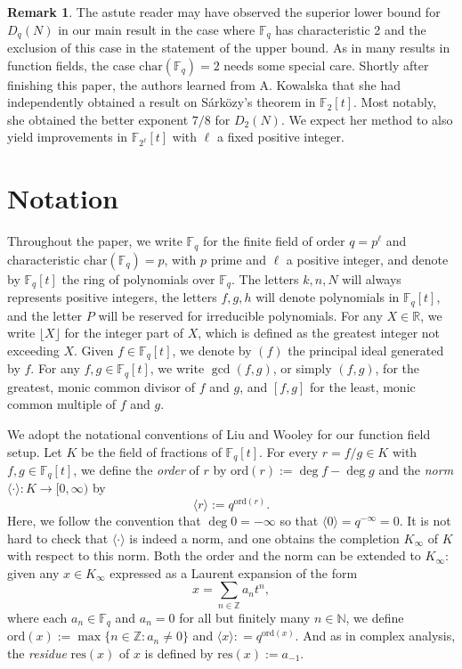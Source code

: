 \documentclass{article}
\theoremstyle{definition}
\theoremstyle{definition}
\newtheorem*{rem}{Remark}
\theoremstyle{remark}
\newcommand{\R}{\mathbb{R}}
\newcommand{\Z}{\mathbb{Z}}
\newcommand{\N}{\mathbb{N}}
\newcommand{\F}{\mathbb{F}_q[t]}
\newcommand{\1}{\mathbf{1}}
\numberwithin{equation}{section}
\begin{document}
\begin{rem}
The astute reader may have observed the superior lower bound for $D_q(N)$ in our main result in the case where $\mathbb{F}_q$ has characteristic 2 and the exclusion of this case in the statement of the upper bound. As in many results in function fields, the case $\text{char}(\mathbb{F}_q)=2$ needs some special care. Shortly after finishing this paper, the authors learned from A. Kowalska \cite{Kowalska26} that she had independently obtained a result on Sárközy's theorem in $\mathbb{F}_2[t]$. Most notably, she obtained the better exponent $7/8$ for $D_2(N)$. We expect her method to also yield improvements in $\mathbb{F}_{2^{\ell}}[t]$ with $\ell$ a fixed positive integer.
\end{rem}



\section{Notation}
Throughout the paper, we write $\mathbb{F}_q$ for the finite field of order $q=p^{\ell}$ and characteristic $\text{char}(\mathbb{F}_q)=p$, with $p$ prime and $\ell$ a positive integer, and denote by $\F$ the ring of polynomials over $\mathbb{F}_q$. The letters $k,n,N$ will always represents positive integers, the letters $f,g,h$ will denote polynomials in $\F$, and the letter $P$ will be reserved for irreducible polynomials. For any $X\in\R$, we write $\lfloor X\rfloor$ for the integer part of $X$, which is defined as the greatest integer not exceeding $X$. Given $f\in\F$, we denote by $(f)$ the principal ideal generated by $f$. For any $f,g\in \F$, we write $\gcd(f,g)$, or simply $(f,g)$, for the greatest, monic common divisor of $f$ and $g$, and $[f,g]$ for the least, monic common multiple of $f$ and $g$.

We adopt the notational conventions of Liu and Wooley \cite{LiuWooley2010} for our function field setup. Let $K$ be the field of fractions of $\F$. For every $r=f\slash g \in K$ with $f,g\in\F$, we define the {\it order} of $r$ by $\text{ord}(r):=\deg f-\deg g$ and the {\it norm} $\langle \cdot \rangle: K\to [0,\infty)$ by 
\[\langle r \rangle :=q^{\text{ord}(r)}.\]
Here, we follow the convention that $\deg 0=-\infty$ so that $\langle 0 \rangle = q^{-\infty}=0$. It is not hard to check that $\langle \cdot \rangle$ is indeed a norm, and one obtains the completion $K_\infty$ of $K$ with respect to this norm. Both the order and the norm can be extended to $K_\infty$: given any $x\in K_{\infty}$ expressed as a Laurent expansion of the form
\[x=\sum_{n\in\Z}a_nt^n,\]
where each $a_n\in\mathbb{F}_q$ and $a_n=0$ for all but finitely many $n\in\N$, we define $\text{ord}(x):=\max\{n\in \Z:a_n\neq 0\}$ and $\langle x \rangle: = q^{\text{ord}(x)}$. And as in complex analysis, the {\it residue} $\text{res}(x)$ of $x$ is defined by $\text{res}(x):=a_{-1}$.
\end{document}
